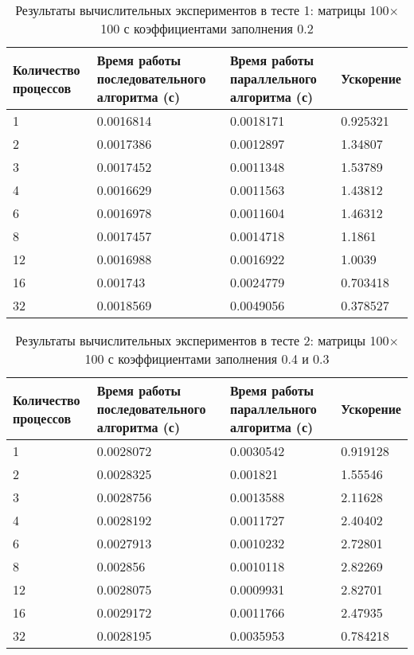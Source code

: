 \documentclass{report}
\begin{document}
\begin{table}[H]
    \caption{Результаты вычислительных экспериментов в тесте 1: матрицы 100\(\times\)100 с коэффициентами заполнения 0.2}
    \centering
    \begin{tabular}{|m{2cm}|m{5cm}|m{5cm}|m{2cm}|}
        \toprule
        Количество процессов & Время работы последовательного алгоритма (с) & Время работы параллельного алгоритма (с) & Ускорение \\
        \midrule
        1  & 0.0016814 & 0.0018171 & 0.925321 \\
        2  & 0.0017386 & 0.0012897 & 1.34807  \\
        3  & 0.0017452 & 0.0011348 & 1.53789  \\
        4  & 0.0016629 & 0.0011563 & 1.43812  \\
        6  & 0.0016978 & 0.0011604 & 1.46312  \\
        8  & 0.0017457 & 0.0014718 & 1.1861   \\
        12 & 0.0016988 & 0.0016922 & 1.0039   \\
        16 & 0.001743  & 0.0024779 & 0.703418 \\
        32 & 0.0018569 & 0.0049056 & 0.378527 \\
        \bottomrule
    \end{tabular}
\end{table}

\begin{table}[H]
    \caption{Результаты вычислительных экспериментов в тесте 2: матрицы 100\(\times\)100 с коэффициентами заполнения 0.4 и 0.3}
    \centering
    \begin{tabular}{|m{2cm}|m{5cm}|m{5cm}|m{2cm}|}
        \toprule
        Количество процессов & Время работы последовательного алгоритма (с) & Время работы параллельного алгоритма (с) & Ускорение \\
        \midrule
        1  & 0.0028072 & 0.0030542 & 0.919128 \\
        2  & 0.0028325 & 0.001821  & 1.55546  \\
        3  & 0.0028756 & 0.0013588 & 2.11628  \\
        4  & 0.0028192 & 0.0011727 & 2.40402  \\
        6  & 0.0027913 & 0.0010232 & 2.72801  \\
        8  & 0.002856  & 0.0010118 & 2.82269  \\
        12 & 0.0028075 & 0.0009931 & 2.82701  \\
        16 & 0.0029172 & 0.0011766 & 2.47935  \\
        32 & 0.0028195 & 0.0035953 & 0.784218 \\
        \bottomrule
    \end{tabular}
\end{table}
\end{document}
